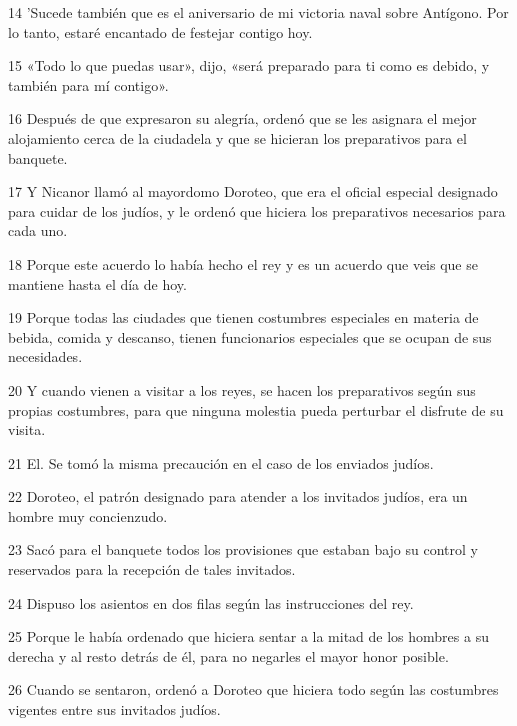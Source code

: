 \par 14 'Sucede también que es el aniversario de mi victoria naval sobre Antígono. Por lo tanto, estaré encantado de festejar contigo hoy.

\par 15 «Todo lo que puedas usar», dijo, «será preparado para ti como es debido, y también para mí contigo».

\par 16 Después de que expresaron su alegría, ordenó que se les asignara el mejor alojamiento cerca de la ciudadela y que se hicieran los preparativos para el banquete.

\par 17 Y Nicanor llamó al mayordomo Doroteo, que era el oficial especial designado para cuidar de los judíos, y le ordenó que hiciera los preparativos necesarios para cada uno.

\par 18 Porque este acuerdo lo había hecho el rey y es un acuerdo que veis que se mantiene hasta el día de hoy.

\par 19 Porque todas las ciudades que tienen costumbres especiales en materia de bebida, comida y descanso, tienen funcionarios especiales que se ocupan de sus necesidades.

\par 20 Y cuando vienen a visitar a los reyes, se hacen los preparativos según sus propias costumbres, para que ninguna molestia pueda perturbar el disfrute de su visita.

\par 21 El. Se tomó la misma precaución en el caso de los enviados judíos.

\par 22 Doroteo, el patrón designado para atender a los invitados judíos, era un hombre muy concienzudo.

\par 23 Sacó para el banquete todos los provisiones que estaban bajo su control y reservados para la recepción de tales invitados.

\par 24 Dispuso los asientos en dos filas según las instrucciones del rey.

\par 25 Porque le había ordenado que hiciera sentar a la mitad de los hombres a su derecha y al resto detrás de él, para no negarles el mayor honor posible.

\par 26 Cuando se sentaron, ordenó a Doroteo que hiciera todo según las costumbres vigentes entre sus invitados judíos.

